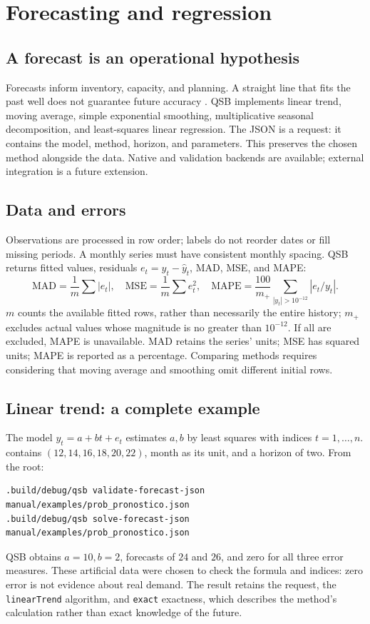 \chapter{Forecasting and regression}
\label{ch:pronosticos}

\section{A forecast is an operational hypothesis}
Forecasts inform inventory, capacity, and planning. A straight line that fits
the past well does not guarantee future accuracy
\cite{hyndman2021forecasting}. QSB implements linear trend, moving average,
simple exponential smoothing, multiplicative seasonal decomposition, and
least-squares linear regression. The JSON is a request: it contains the model,
method, horizon, and parameters. This preserves the chosen method alongside
the data. Native and validation backends are available; external integration
is a future extension.

\section{Data and errors}
Observations are processed in row order; labels do not reorder dates or fill
missing periods. A monthly series must have consistent monthly spacing. QSB
returns fitted values, residuals \(e_t=y_t-\hat y_t\), MAD, MSE, and MAPE:
\[
 \mathrm{MAD}=\frac1m\sum|e_t|,\quad
 \mathrm{MSE}=\frac1m\sum e_t^2,\quad
 \mathrm{MAPE}=\frac{100}{m_+}\sum_{|y_t|>10^{-12}}|e_t/y_t|.
\]
\(m\) counts the available fitted rows, rather than necessarily the entire
history; \(m_+\) excludes actual values whose magnitude is no greater than
\(10^{-12}\). If all are excluded, MAPE is unavailable. MAD retains the
series' units; MSE has squared units; MAPE is reported as a percentage.
Comparing methods requires considering that moving average and smoothing omit
different initial rows.

\section{Linear trend: a complete example}
The model \(y_t=a+bt+e_t\) estimates \(a,b\) by least squares with indices
\(t=1,\ldots,n\).  contains
\((12,14,16,18,20,22)\), month as its unit, and a horizon of two. From the
root:
\begin{lstlisting}
.build/debug/qsb validate-forecast-json manual/examples/prob_pronostico.json
.build/debug/qsb solve-forecast-json manual/examples/prob_pronostico.json
\end{lstlisting}
QSB obtains \(a=10,b=2\), forecasts of \(24\) and \(26\), and zero for
all three error measures. These artificial data were chosen to check the
formula and indices: zero error is not evidence about real demand. The result
retains the request, the \texttt{linearTrend} algorithm, and \texttt{exact}
exactness, which describes the method's calculation rather than exact knowledge
of the future.

